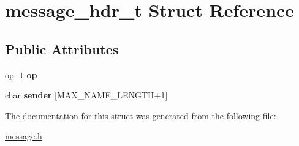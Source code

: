 \hypertarget{structmessage__hdr__t}{}\section{message\+\_\+hdr\+\_\+t Struct Reference}
\label{structmessage__hdr__t}
\subsection*{Public Attributes}
\begin{DoxyCompactItemize}
\item 
\hyperlink{ops_8h_ac6fa1b34da8872e34c2936391332f44c}{op\+\_\+t} {\bfseries op}\hypertarget{structmessage__hdr__t_ab7f4eacc8e900cca79b63ddfb02d67fd}{}\label{structmessage__hdr__t_ab7f4eacc8e900cca79b63ddfb02d67fd}

\item 
char {\bfseries sender} \mbox{[}M\+A\+X\+\_\+\+N\+A\+M\+E\+\_\+\+L\+E\+N\+G\+TH+1\mbox{]}\hypertarget{structmessage__hdr__t_a53c6bc32851e00a0fe818315d5029f43}{}\label{structmessage__hdr__t_a53c6bc32851e00a0fe818315d5029f43}

\end{DoxyCompactItemize}


The documentation for this struct was generated from the following file\+:\begin{DoxyCompactItemize}
\item 
\hyperlink{message_8h}{message.\+h}\end{DoxyCompactItemize}
